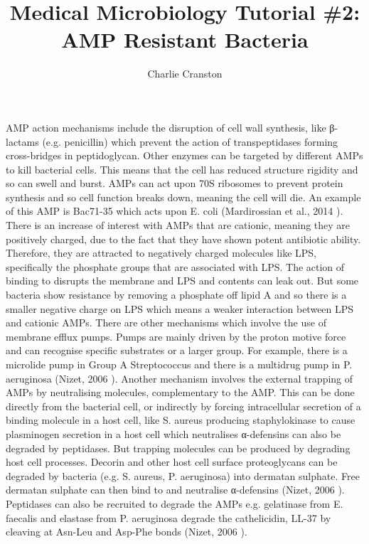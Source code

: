 

\title{Medical Microbiology Tutorial \#2: AMP Resistant Bacteria}
\author{Charlie Cranston}
\maketitle

AMP action mechanisms include the disruption of cell wall synthesis, like β-lactams (e.g. penicillin) which prevent the action of transpeptidases forming cross-bridges in peptidoglycan. Other enzymes can be targeted by different AMPs to kill bacterial cells. This means that the cell has reduced structure rigidity and so can swell and burst. AMPs can act upon 70S ribosomes to prevent protein synthesis and so cell function breaks down, meaning the cell will die. An example of this AMP is Bac71-35 which acts upon E. coli (Mardirossian et al., 2014 \cite{mardirossian}). There is an increase of interest with AMPs that are cationic, meaning they are positively charged, due to the fact that they have shown potent antibiotic ability. Therefore, they are attracted to negatively charged molecules like LPS, specifically the phosphate groups that are associated with LPS. The action of binding to disrupts the membrane and LPS and contents can leak out.
But some bacteria show resistance by removing a phosphate off lipid A and so there is a smaller negative charge on LPS which means a weaker interaction between LPS and cationic AMPs. There are other mechanisms which involve the use of membrane efflux pumps. Pumps are mainly driven by the proton motive force and can recognise specific substrates or a larger group. For example, there is a microlide pump in Group A Streptococcus and there is a multidrug pump in P. aeruginosa (Nizet, 2006 \cite{nizetv}). Another mechanism involves the external trapping of AMPs by neutralising molecules, complementary to the AMP. This can be done directly from the bacterial cell, or indirectly by forcing intracellular secretion of a binding molecule in a host cell, like S. aureus producing staphylokinase to cause plasminogen secretion in a host cell which neutralises α-defensins can also be degraded by peptidases. But trapping molecules can be produced by degrading host cell processes. Decorin and other host cell surface proteoglycans can be degraded by bacteria (e.g. S. aureus, P. aeruginosa) into dermatan sulphate. Free dermatan sulphate can then bind to and neutralise α-defensins (Nizet, 2006 \cite{nizetv}). Peptidases can also be recruited to degrade the AMPs e.g. gelatinase from E. faecalis and elastase from P. aeruginosa degrade the cathelicidin, LL-37 by cleaving at Asn-Leu and Asp-Phe bonds (Nizet, 2006 \cite{nizetv}).

